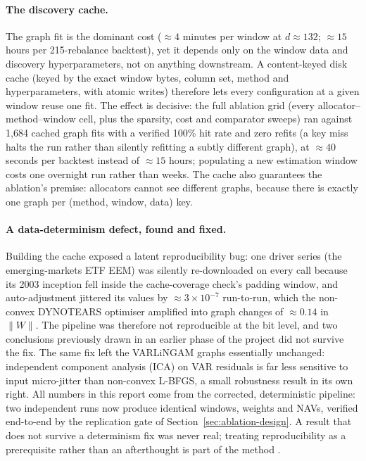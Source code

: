 \paragraph{The discovery cache.} The graph fit is the dominant cost
(${\approx}4$ minutes per window at $d\approx132$; ${\approx}15$ hours per
215-rebalance backtest), yet it depends only on the window data and discovery
hyperparameters, not on anything downstream. A content-keyed disk cache
(keyed by the exact window bytes, column set, method and hyperparameters,
with atomic writes) therefore lets every configuration at a given window
reuse one fit. The effect is decisive: the full ablation grid (every
allocator--method--window cell, plus the sparsity, cost and comparator
sweeps) ran against 1{,}684 cached graph fits with a verified 100\% hit
rate and zero refits (a key miss halts the run rather than silently
refitting a subtly different graph), at ${\approx}40$ seconds per backtest
instead of ${\approx}15$ hours; populating a new estimation window costs
one overnight run rather than weeks. The cache also
guarantees the ablation's
premise: allocators cannot see different graphs, because there is exactly
one graph per (method, window, data) key.

\paragraph{A data-determinism defect, found and fixed.} Building the cache
exposed a latent reproducibility bug: one driver series (the
emerging-markets ETF EEM) was silently re-downloaded on every call because
its 2003 inception fell inside the cache-coverage check's padding window,
and auto-adjustment jittered its values by ${\approx}3\times10^{-7}$
run-to-run, which the non-convex DYNOTEARS optimiser amplified into graph
changes of ${\approx}0.14$ in $\lVert W\rVert$. The pipeline was therefore
not reproducible at the bit level, and two conclusions previously drawn
in an earlier phase of the project did not survive the fix. The same fix left
the VARLiNGAM graphs essentially unchanged: independent component analysis
(ICA) on VAR residuals is far
less sensitive to input micro-jitter than non-convex L-BFGS, a small
robustness result in its own right. All numbers in this report come from
the corrected, deterministic pipeline: two independent runs now produce
identical windows, weights and NAVs, verified end-to-end by the
replication gate of Section~\ref{sec:ablation-design}. A result that does
not survive a determinism fix was never real; treating reproducibility as a
prerequisite rather than an afterthought is part of the method
\cite{lopezdeprado2023causal}.
